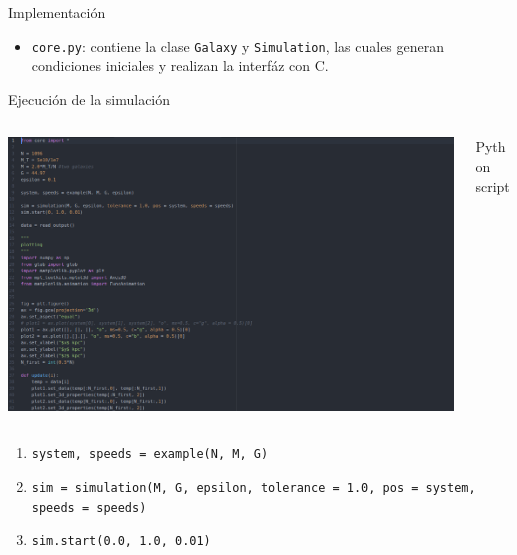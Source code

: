 \documentclass[handout]{beamer}
\begin{document}
\begin{frame}{Implementaci\'on}
	\begin{tcolorbox}[colback=blue!5,colframe=blue!40!black,title=Python]
		\begin{itemize}
			\item \texttt{core.py}: contiene la clase \texttt{Galaxy} y \texttt{Simulation}, las cuales generan condiciones iniciales y realizan la interf\'az con C.
		\end{itemize}
	\end{tcolorbox}
\end{frame}
\begin{frame}{Ejecuci\'on de la simulaci\'on}
	\begin{columns}
		\begin{column}{0.75\textwidth}
			\includegraphics[height=0.5\textheight]{sources/images/code.png}
		\end{column}
		\begin{column}{0.25\textwidth}
			Python script
		\end{column}
	\end{columns}
	\begin{enumerate}
		\item \texttt{system, speeds = example(N, M, G)} \pause
		\item {\footnotesize\texttt{sim = simulation(M, G, epsilon, tolerance = 1.0, pos = system, speeds = speeds)}} \pause
		\item \texttt{sim.start(0.0, 1.0, 0.01)}
	\end{enumerate}
\end{frame}
\end{document}
